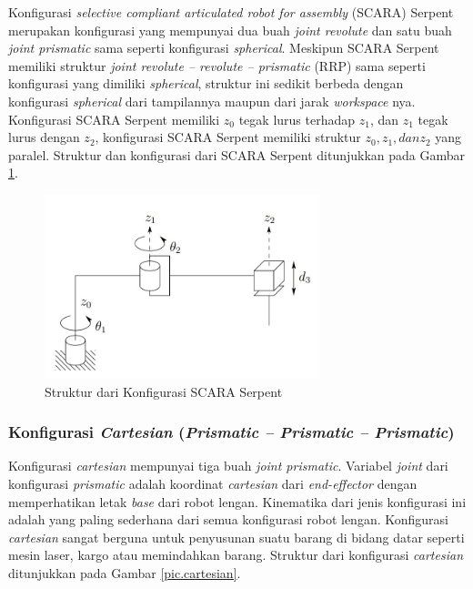 Konfigurasi \textit{selective compliant articulated robot for assembly} (SCARA) Serpent merupakan konfigurasi yang mempunyai dua buah \textit{joint revolute} dan satu buah \textit{joint prismatic} sama seperti konfigurasi \textit{spherical}. Meskipun SCARA Serpent memiliki struktur \textit{joint revolute – revolute – prismatic} (RRP) sama seperti konfigurasi yang dimiliki \textit{spherical}, struktur ini sedikit berbeda dengan konfigurasi \textit{spherical} dari tampilannya maupun dari jarak \textit{workspace} nya. Konfigurasi SCARA Serpent memiliki $z_{0}$ tegak lurus terhadap $z_{1}$, dan $z_{1}$ tegak lurus dengan $z_{2}$, konfigurasi SCARA Serpent memiliki struktur $z_{0}, z_{1}, dan z_{2}$ yang paralel. Struktur dan konfigurasi dari SCARA Serpent ditunjukkan pada Gambar \ref{pic.SCARA212112122}.
\begin{figure}[H]
	\centering

	\includegraphics[width=8cm]{gambar/SCARA.jpg}
	\caption{Struktur dari Konfigurasi SCARA Serpent\cite{Spong2006}}
		\label{pic.SCARA212112122}
\end{figure}


\subsubsection{Konfigurasi \textit{Cartesian} (\textit{Prismatic – Prismatic – Prismatic})  } 

Konfigurasi \textit{cartesian} mempunyai tiga buah \textit{joint prismatic}. Variabel \textit{joint} dari konfigurasi \textit{prismatic} adalah koordinat \textit{cartesian} dari \textit{end-effector} dengan memperhatikan letak \textit{base} dari robot lengan. Kinematika dari jenis konfigurasi ini adalah yang paling sederhana dari semua konfigurasi robot lengan. Konfigurasi \textit{cartesian} sangat berguna untuk penyusunan suatu barang di bidang datar seperti mesin laser, kargo atau memindahkan barang. Struktur dari konfigurasi \textit{cartesian} ditunjukkan pada Gambar \ref{pic.cartesian}.

